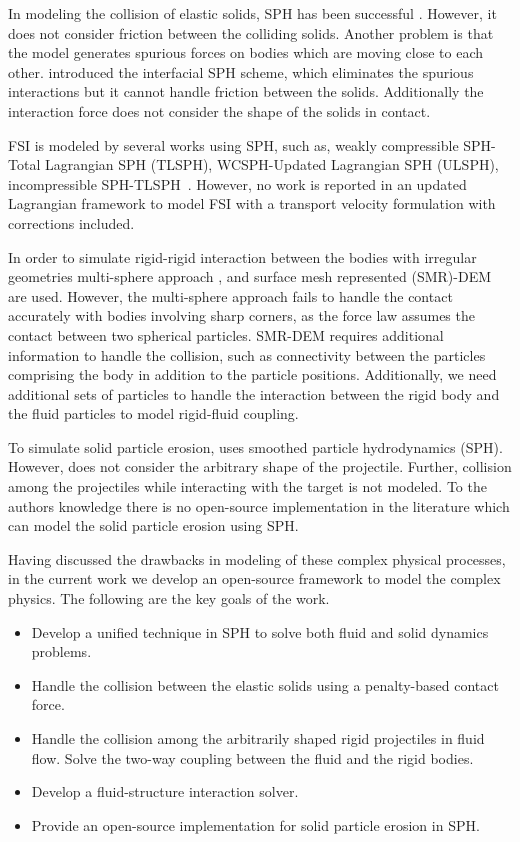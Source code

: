 In modeling the collision of elastic solids, SPH has been successful
\parencite{gray2001sph}. However, it does not consider friction between the
colliding solids. Another problem is that the model generates spurious forces on
bodies which are moving close to each other. \textcite{yan2021simulation}
introduced the interfacial SPH scheme, which eliminates the spurious
interactions but it cannot handle friction between the solids. Additionally the
interaction force does not consider the shape of the solids in contact.


FSI is modeled by several works using SPH, such as, weakly compressible
SPH-Total Lagrangian SPH (TLSPH), WCSPH-Updated Lagrangian SPH (ULSPH),
incompressible SPH-TLSPH~\parencite{khayyer2022systematic}. However, no work is
reported in an updated Lagrangian framework to model FSI with a transport
velocity formulation with corrections included.


In order to simulate rigid-rigid interaction between the bodies with irregular
geometries multi-sphere approach \parencite{kruggel-emden_study_2008}, and
surface mesh represented (SMR)-DEM ~\parencite{zhan2021surface} are used.
However, the multi-sphere approach fails to handle the contact accurately with
bodies involving sharp corners, as the force law assumes the contact between two
spherical particles. SMR-DEM requires additional information to handle the
collision, such as connectivity between the particles comprising the body in
addition to the particle positions. Additionally, we need additional sets of
particles to handle the interaction between the rigid body and the fluid
particles to model rigid-fluid coupling.


To simulate solid particle erosion, \textcite{dong2016smoothed} uses smoothed
particle hydrodynamics (SPH). However, \textcite{dong2016smoothed} does not
consider the arbitrary shape of the projectile. Further, collision among the
projectiles while interacting with the target is not modeled. To the authors
knowledge there is no open-source implementation in the literature which can
model the solid particle erosion using SPH.


Having discussed the drawbacks in modeling of these complex physical processes,
in the current work we develop an open-source framework to model the complex
physics. The following are the key goals of the work.
\begin{itemize}
\item Develop a unified technique in SPH to solve both fluid and solid dynamics
  problems.
\item Handle the collision between the elastic solids using a penalty-based contact force.
\item Handle the collision among the arbitrarily shaped rigid projectiles in fluid
  flow. Solve the two-way coupling between the fluid and the rigid bodies.
\item Develop a fluid-structure interaction solver.
\item Provide an open-source implementation for solid particle erosion in SPH.
\end{itemize}

